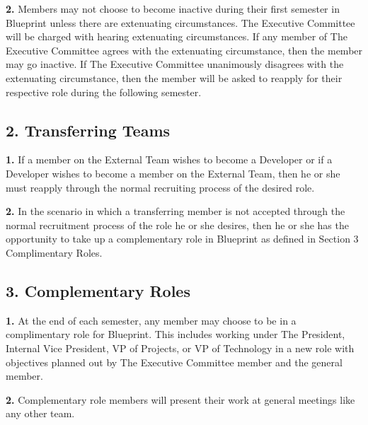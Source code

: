 \documentclass{article}
\begin{document}
\textbf{2.} Members may not choose to become inactive during their first semester in Blueprint unless there are extenuating circumstances. The Executive Committee will be charged with hearing extenuating circumstances. If any member of The Executive Committee agrees with the extenuating circumstance, then the member may go inactive. If The Executive Committee unanimously disagrees with the extenuating circumstance, then the member will be asked to reapply for their respective role during the following semester.

\subsection{2. Transferring Teams}

\textbf{1.} If a member on the External Team wishes to become a Developer or if a Developer wishes to become a member on the External Team, then he or she must reapply through the normal recruiting process of the desired role.

\textbf{2.} In the scenario in which a transferring member is not accepted through the normal recruitment process of the role he or she desires, then he or she has the opportunity to take up a complementary role in Blueprint as defined in Section 3 Complimentary Roles. 

\subsection{3. Complementary Roles}

\textbf{1.} At the end of each semester, any member may choose to be in a complimentary role for Blueprint. This includes working under The President, Internal Vice President, VP of Projects, or VP of Technology in a new role with objectives planned out by The Executive Committee member and the general member. 

\textbf{2.} Complementary role members will present their work at general meetings like any other team.
\end{document}
